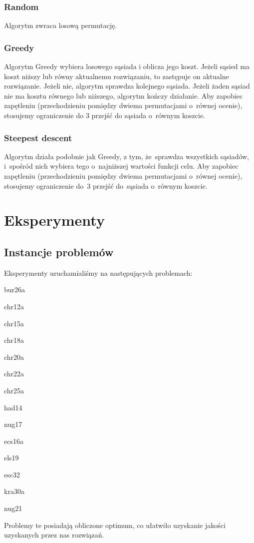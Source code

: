 \documentclass[a4paper,10pt]{article}
\begin{document}
\subsubsection{Random}
Algorytm zwraca losową permutację.

\subsubsection{Greedy}
Algorytm Greedy wybiera losowego sąsiada i oblicza jego koszt.
Jeżeli sąsied ma koszt niższy lub równy aktualnemu rozwiązaniu, to zastępuje on aktualne rozwiązanie.
Jeżeli nie, algorytm sprawdza kolejnego sąsiada.
Jeżeli żaden sąsiad nie ma kosztu równego lub niższego, algorytm kończy działanie.
Aby zapobiec zapętleniu (przechodzieniu pomiędzy dwiema permutacjami o~równej ocenie), stosujemy ograniczenie do 3 przejść do sąsiada o~równym koszcie.

\subsubsection{Steepest descent}
Algorytm działa podobnie jak Greedy, z tym, że~sprawdza wszystkich sąsiadów, i~spośród nich wybiera tego
o~najniższej wartości funkcji celu.
Aby zapobiec zapętleniu (przechodzieniu pomiędzy dwiema permutacjami o~równej ocenie),
stosujemy ograniczenie do~3 przejść do~sąsiada o~równym koszcie.

\section{Eksperymenty}
\subsection{Instancje problemów}
Eksperymenty uruchamialiśmy na następujących problemach:
\begin{tightenum}
\item bur26a
\item chr12a
\item chr15a
\item chr18a
\item chr20a
\item chr22a
\item chr25a
\item had14
\item nug17
\item ecs16a
\item els19
\item esc32
\item kra30a
\item nug21
\end{tightenum}
Problemy te posiadają obliczone optimum, co ułatwiło uzyskanie jakości uzyskanych przez nas rozwiązań.
\end{document}

